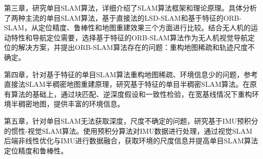 第三章，研究单目SLAM算法，详细介绍了SLAM算法框架和理论原理。具体分析了两种主流的单目SLAM算法，基于直接法的LSD-SLAM和基于特征的ORB-SLAM，从定位精度、鲁棒性和地图重建效果三个方面进行比较。结合无人机的运动特性和导航定位需要，选择基于特征的ORB-SLAM算法作为无人机视觉导航定位的解决方案，并提出ORB-SLAM算法存在的问题：重构地图稀疏和轨迹尺度不确定。

第四章，针对基于特征的单目SLAM算法重构地图稀疏、环境信息少的问题，参考直接法SLAM半稠密地图重建原理，研究基于特征的单目半稠密SLAM算法。在原有算法的基础上，通过块匹配、逆深度假设和一致性检验，在宽基线情况下重构环境半稠密地图，提供丰富的环境信息。

第五章，针对单目SLAM无法获取深度，尺度不确定的问题，研究基于IMU预积分的惯性-视觉SLAM算法。使用预积分算法对IMU数据进行处理，通过视觉SLAM后端非线性优化与IMU进行数据融合，获取环境的尺度信息并提高单目SLAM算法定位精度和鲁棒性。
